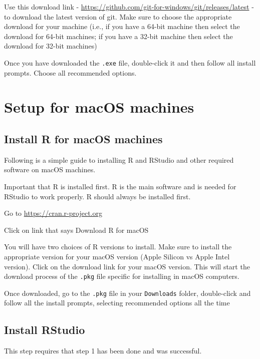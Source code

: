 \documentclass[
  12pt,
]{book}
\begin{document}
Use this download link - \url{https://github.com/git-for-windows/git/releases/latest} - to download the latest version of git. Make sure to choose the appropriate download for your machine (i.e., if you have a 64-bit machine then select the download for 64-bit machines; if you have a 32-bit machine then select the download for 32-bit machines)

Once you have downloaded the \texttt{.exe} file, double-click it and then follow all install prompts. Choose all recommended options.

\hypertarget{setup-for-macos-machines}{%
\section{Setup for macOS machines}\label{setup-for-macos-machines}}

\hypertarget{install-r-for-macos-machines}{%
\subsection{Install R for macOS machines}\label{install-r-for-macos-machines}}

Following is a simple guide to installing R and RStudio and other required software on macOS machines.

Important that R is installed first. R is the main software and is needed for RStudio to work properly. R should always be installed first.

Go to \url{https://cran.r-project.org}

Click on link that says Download R for macOS

You will have two choices of R versions to install. Make sure to install the appropriate version for your macOS version (Apple Silicon vs Apple Intel version). Click on the download link for your macOS version. This will start the download process of the \texttt{.pkg} file specific for installing in macOS computers.

Once downloaded, go to the \texttt{.pkg} file in your \texttt{Downloads} folder, double-click and follow all the install prompts, selecting recommended options all the time

\hypertarget{install-rstudio-1}{%
\subsection{Install RStudio}\label{install-rstudio-1}}

This step requires that step 1 has been done and was successful.
\end{document}

